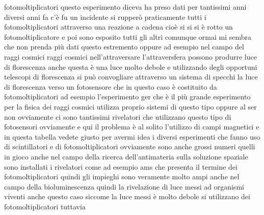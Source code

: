 {fotomoltiplicatori questo esperimento diceva ha preso dati per tantissimi anni diversi anni fa c'è fu un incidente si rupperò praticamente tutti i fotomoltiplicatori attraverso una reazione a cadena cioè si si si è rotto un fotomoltiplicatore e poi sono esposito tutti gli altri comunque ormai mi sembra che non prenda più dati questo estremento oppure ad esempio nel campo del raggi cosmici raggi cosmici nell'attraversare l'attraversfera possono produrre luce di florescenza anche questa è una luce molto debole e utilizzando degli opportuni telescopi di florescenza si può convogliare attraverso un sistema di specchi la luce di florescenza verso un fotosensore che in questo caso è costituito da fotomoltiplicatori ad esempio l'esperimento ger che è il più grande esperimento per la fisica dei raggi cosmici utilizza proprio sistemi di questo tipo oppure al ser non ovviamente ci sono tantissimi rivelatori che utilizzano questo tipo di fotosensori ovviamente e qui il problema è al solito l'utilizzo di campi magnetici e in questa tabella vedete giusto per avermi idea i diversi esperimenti che fanno uso di scintillatori e di fotomoltiplicatori ovviamente sono anche grossi numeri quelli in gioco anche nel campo della ricerca dell'antimateria sulla soluzione spaziale sono installati i rivelatori come ad esempio ams che presenta il termine dei fotomoltiplicatori quindi gli impieghi sono veramente molto ampi anche nel campo della bioluminescenza quindi la rivelazione di luce messi ad organismi viventi anche questo caso siccome la luce messi è molto debole si utilizzano dei fotomoltiplicatori tuttavia 
}

